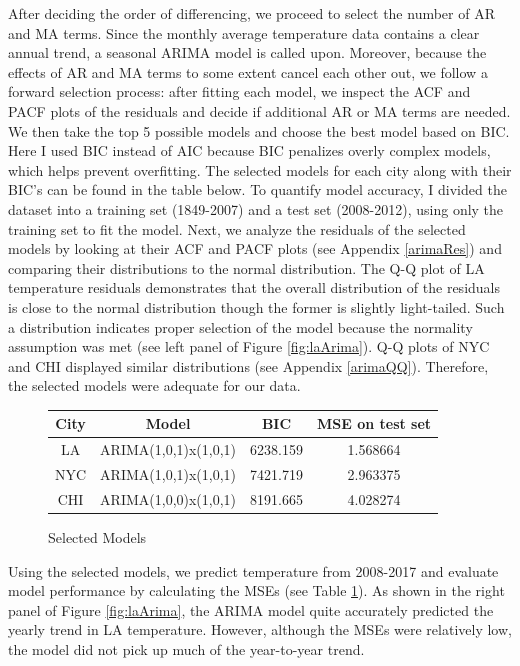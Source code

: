\documentclass[12pt]{article}
\begin{document}
\noindent After deciding the order of differencing, we proceed to select the number of AR and MA terms. Since the monthly average temperature data contains a clear annual trend, a seasonal ARIMA model is called upon. Moreover, because the effects of AR and MA terms to some extent cancel each other out, we follow a forward selection process:  after fitting each model, we inspect the ACF and PACF plots of the residuals and decide if additional AR or MA terms are needed. We then take the top 5 possible models and choose the best model based on BIC. Here I used BIC instead of AIC because BIC penalizes overly complex models, which helps prevent overfitting. The selected models for each city along with their BIC's can be found in the table below. To quantify model accuracy, I divided the dataset into a training set (1849-2007) and a test set (2008-2012), using only the training set to fit the model. Next, we analyze the residuals of the selected models by looking at their ACF and PACF plots (see Appendix \ref{arimaRes}) and comparing their distributions to the normal distribution. The Q-Q plot of LA temperature residuals demonstrates that the overall distribution of the residuals is close to the normal distribution though the former is slightly light-tailed. Such a distribution indicates proper selection of the model because the normality assumption was met (see left panel of Figure \ref{fig:laArima}). Q-Q plots of NYC and CHI displayed similar distributions (see Appendix \ref{arimaQQ}). Therefore, the selected models were adequate for our data. 

\begin{figure}[H]
    \centering
    \begin{tabular}{ | c | c | c | c |}
    \hline
    City & Model & BIC & MSE on test set \\ \hline
    
    LA & ARIMA(1,0,1)x(1,0,1) & 6238.159 & 1.568664 \\ \hline
    
    NYC & ARIMA(1,0,1)x(1,0,1) & 7421.719 & 2.963375\\ \hline
    
    CHI & ARIMA(1,0,0)x(1,0,1) & 8191.665 & 4.028274 \\ \hline
    
    \end{tabular}  
    \caption{Selected Models}
    \label{fig:model}
\end{figure}

\noindent Using the selected models, we predict temperature from 2008-2017 and evaluate model performance by calculating the MSEs (see Table \ref{fig:model}). As shown in the right panel of Figure \ref{fig:laArima}, the ARIMA model quite accurately predicted the yearly trend in LA temperature. However, although the MSEs were relatively low, the model did not pick up much of the year-to-year trend.
\end{document}
